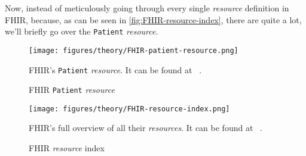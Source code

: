 \noindent
Now, instead of meticulously going through every single \emph{resource} definition in FHIR, because, as can be seen in \autoref{fig:FHIR-resource-index}, there are quite a lot, we'll briefly go over the \texttt{Patient} \emph{resource}.

\begin{figure}[H]
    \centering
    \texttt{[image: figures/theory/FHIR-patient-resource.png]}
    \caption{FHIR \texttt{Patient} \emph{resource}}
    \medskip
    \small
    \raggedright
    FHIR's \texttt{Patient} \emph{resource}. It can be found at ~\cite{FHIR-patient-resource}.
    \label{fig:FHIR-patient-resource}
\end{figure}

\begin{figure}[H]
    \centering
    \texttt{[image: figures/theory/FHIR-resource-index.png]}
    \caption{FHIR \emph{resource} index}
    \medskip
    \small
    \raggedright
    FHIR's full overview of all their \emph{resources}. It can be found at ~\cite{FHIR-resource-index}.
    \label{fig:FHIR-resource-index}
\end{figure}
